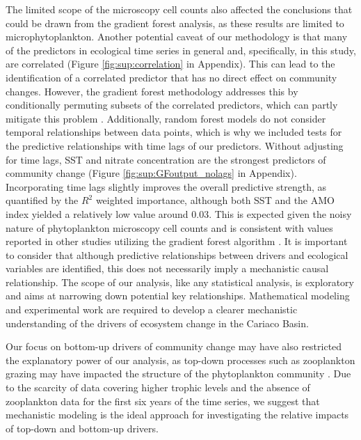 \documentclass[draft]{agujournal2019}
\begin{document}
    
    The limited scope of the microscopy cell counts also affected the conclusions that could be drawn from the gradient forest analysis, as these results are limited to microphytoplankton. 
    Another potential caveat of our methodology is that many of the predictors in ecological time series in general and, specifically, in this study, are correlated (Figure \ref{fig:sup:correlation} in Appendix). This can lead to the identification of a correlated predictor that has no direct effect on community changes. However, the gradient forest methodology addresses this by conditionally permuting subsets of the correlated predictors, which can partly mitigate this problem \cite{ellis_gradient_2012}. Additionally, random forest models do not consider temporal relationships between data points, which is why we included tests for the predictive relationships with time lags of our predictors. Without adjusting for time lags, SST and nitrate concentration are the strongest predictors of community change (Figure \ref{fig:sup:GFoutput_nolags} in Appendix). Incorporating time lags slightly improves the overall predictive strength, as quantified by the $R^2$ weighted importance, although both SST and the AMO index yielded a relatively low value around \qty{0.03}{}. This is expected given the noisy nature of phytoplankton microscopy cell counts and is consistent with values reported in other studies utilizing the gradient forest algorithm \cite{roland_pitcher_exploring_2012, roubeix_identification_2016, samhouri_defining_2017, fraker_temporal_2022}. It is important to consider that although predictive relationships between drivers and ecological variables are identified, this does not necessarily imply a mechanistic causal relationship. The scope of our analysis, like any statistical analysis, is exploratory and aims at narrowing down potential key relationships. Mathematical modeling and experimental work are required to develop a clearer mechanistic understanding of the drivers of ecosystem change in the Cariaco Basin.
     
    Our focus on bottom-up drivers of community change may have also restricted the explanatory power of our analysis, as top-down processes such as zooplankton grazing may have impacted the structure of the phytoplankton community \cite{frank_ups_2007, banas_adding_2011, acevedo-trejos_mechanisms_2015}. Due to the scarcity of data covering higher trophic levels and the absence of zooplankton data for the first six years of the time series, we suggest that mechanistic modeling is the ideal approach for investigating the relative impacts of top-down and bottom-up drivers.
    
\end{document}
